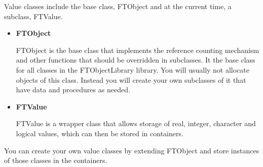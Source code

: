 \documentclass[9pt]{article}
\begin{document}
 Value classes include the base class, FTObject and at the current time, a subclass, FTValue.
 \begin{itemize}
 \item {\bf FTObject}
 
  FTObject is the base class that implements
 the reference counting mechanism and other functions that should be overridden in subclasses.
 It the base class for all classes in the FTObjectLibrary library. You will usually not allocate objects
 of this class. Instead you will create your own subclasses of it that have data and procedures as needed.
 \item {\bf FTValue}
 
  FTValue is a wrapper class that
 allows storage of real, integer, character and logical
 values, which can then be stored in containers.
 
% 
 \end{itemize}
 
  You can create your own value
 classes by extending FTObject and store instances of those classes in the containers.
\end{document}
